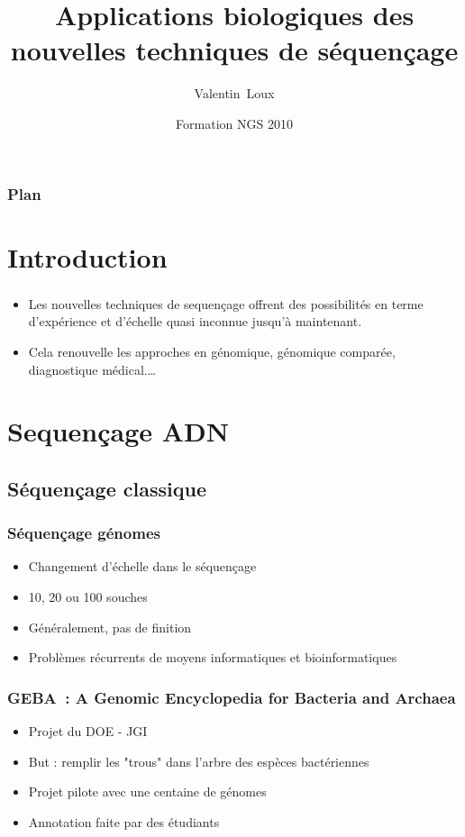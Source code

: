 \documentclass{beamer}
\title[Applications NGS] %
{Applications biologiques des nouvelles techniques de séquençage}
\author[V. Loux] %
{Valentin~Loux}
\institute[INRA-MIG] %
{
  Unité Mathématique, Informatique et Génome\\
  INRA, Jouy en Josas
}
\date[2 Novembre 2010] %
{Formation NGS 2010}
\begin{document}
	
	
\begin{frame}
  \titlepage
\end{frame}

\begin{frame}
  \frametitle{Plan}
  \tableofcontents
\end{frame}


\section{Introduction}

\begin{frame}
  \frametitle{}
	\begin{itemize}
		\item Les nouvelles techniques de sequençage offrent des possibilités en terme d'expérience et d'échelle quasi inconnue jusqu'à maintenant.
		\item	Cela renouvelle les approches en génomique, génomique comparée, diagnostique médical.\ldots
	\end{itemize}
\end{frame}


\section{Sequençage ADN} %
\label{sec:sequençage_resequençage_massif}



\subsection{Séquençage classique} %
\label{sub:séquençage_classique_}



\begin{frame}
	\frametitle{Séquençage génomes}
\begin{itemize}
	\item Changement d'échelle dans le séquençage
	\item 10, 20 ou 100 souches
	\item Généralement, pas de finition
	\item Problèmes récurrents de moyens informatiques et bioinformatiques
\end{itemize}
\end{frame}




\begin{frame}
	\frametitle{GEBA~: A Genomic Encyclopedia for Bacteria and Archaea}
\begin{itemize}
\item Projet du DOE - JGI
\item But : remplir les "trous" dans l'arbre des espèces bactériennes
\item Projet pilote avec une centaine de génomes
\item Annotation faite par des étudiants
\end{itemize}
\end{frame}
\end{document}
